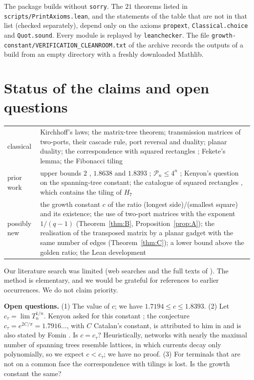 \documentclass[11pt]{amsart}
\theoremstyle{plain}
\theoremstyle{definition}
\theoremstyle{remark}
\newcommand{\code}[1]{\texttt{#1}}
\begin{document}
The package builds without \code{sorry}. The $21$ theorems listed in \code{scripts/PrintAxioms.lean}, and the
statements of the table that are not in that list (checked separately), depend only on the axioms
\code{propext}, \code{Classical.choice} and \code{Quot.sound}. Every module is replayed by \code{leanchecker}.
The file \code{growth-constant/VERIFICATION\_CLEANROOM.txt} of the archive records the outputs of a build from an
empty directory with a freshly downloaded Mathlib.

\section{Status of the claims and open questions}

\begin{center}
\small
\begin{tabularx}{\linewidth}{l X}
\toprule
classical& Kirchhoff's laws; the matrix-tree theorem; transmission matrices of two-ports, their cascade rule,
port reversal and duality; planar duality; the correspondence with squared rectangles \cite{BSST}; Fekete's
lemma; the Fibonacci tiling\\
prior work& upper bounds $2$ \cite{Conway,Kenyon}, $1.8638$ \cite{Fomin} and $1.8393$ \cite{Stoimenow};
$\mathcal P_n\le4^n$ \cite{Keleti}; Kenyon's question on the spanning-tree constant; the catalogue of squared
rectangles \cite{Anderson}, which contains the tiling of $H_7$\\
possibly new& the growth constant $c$ of the ratio (longest side)/(smallest square) and its existence; the use of
two-port matrices with the exponent $1/(q-1)$ (Theorem~\ref{thm:B}, Proposition~\ref{prop:A}); the realisation of
the transposed matrix by a planar gadget with the same number of edges (Theorem~\ref{thm:C}); a lower bound above
the golden ratio; the Lean development\\
\bottomrule
\end{tabularx}
\end{center}
Our literature search was limited (web searches and the full texts of \cite{Kenyon,Fomin,Keleti}). The method is
elementary, and we would be grateful for references to earlier occurrences. We do not claim priority.

\textbf{Open questions.} (1) The value of $c$; we have $1.7194\le c\le1.8393$. (2) Let
$c_\tau=\lim T_n^{1/n}$. Kenyon asked for this constant \cite[Problem~2]{Kenyon}; the conjecture
$c_\tau=e^{2C/\pi}=1.7916\ldots$, with $C$ Catalan's constant, is attributed to him in \cite{CKPknots} and is
also stated by Fomin \cite{Fomin}. Is $c=c_\tau$? Heuristically, networks with nearly the maximal number of
spanning trees resemble lattices, in which currents decay only polynomially, so we expect $c<c_\tau$; we have no
proof. (3) For terminals that are not on a common face the
correspondence with tilings is lost. Is the growth constant the same?
\end{document}
